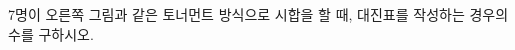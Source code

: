 \noindent\begin{minipage}[t]{0.58\linewidth}\vspace{0pt}\raggedright 7명이 오른쪽 그림과 같은 토너먼트 방식으로 시합을 할 때, 대진표를 작성하는 경우의 수를 구하시오.\end{minipage}\hfill\begin{minipage}[t]{0.4\linewidth}\vspace{0pt}\centering \resizebox{\ifdim\width>\linewidth\linewidth\else\width\fi}{!}{}\end{minipage}\par
